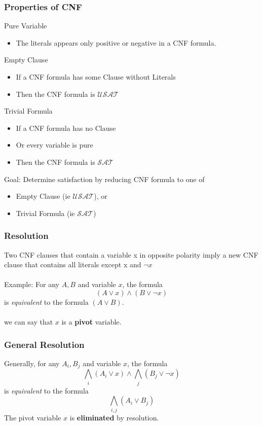 \documentclass{beamer}
\def\msat{{\mathcal{SAT}}}
\def\musat{{\mathcal{USAT}}}
\begin{document}
\begin{frame}
\frametitle{Properties of CNF}
Pure Variable
\begin{itemize}
\item The literals appears only positive or negative in a CNF formula.
\end{itemize}
Empty Clause
\begin{itemize}
\item If a CNF formula has some Clause without Literals
\item Then the CNF formula is $\pmb\musat$
\end{itemize}
Trivial Formula
\begin{itemize}
\item If a CNF formula has no Clause
\item Or every variable is pure
\item Then the CNF formula is $\pmb{\msat}$
\end{itemize}
Goal: Determine satisfaction by reducing CNF formula to one of
\begin{itemize}
\item Empty Clause (ie $\pmb\musat$), or
\item Trivial Formula (ie $\pmb\msat$)
\end{itemize}

\end{frame}


\begin{frame}
\frametitle{Resolution}
Two CNF clauses that contain a variable x in opposite polarity imply a new
CNF clause that contains all literals except x and $\neg x$ \\~\\

Example: For any $A,B$ and variable $x$, the formula
\[
(A \vee x) \wedge (B \vee \neg x)
\]
is {\it equivalent} to the formula $(A \vee B)$.\\~\\
we can say that $x$ is a {\bf pivot} variable.
\end{frame}


\begin{frame}
\frametitle{General Resolution}
Generally, for any $A_i,B_j$ and variable $x$, the formula
\[
\bigwedge_i
(A_i \vee x) \wedge
\bigwedge_j
(B_j \vee \neg x)
\]
is {\it equivalent} to the formula
\[
\bigwedge_{i,j}
(A_i \vee B_j )
\]
The pivot variable $x$ is {\bf eliminated} by resolution.

\end{frame}
\end{document}
